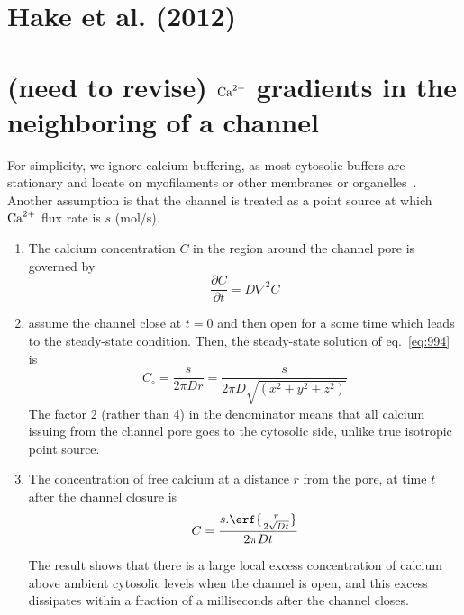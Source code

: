 \section{Hake et al. (2012)}

\section{(need to revise) ${\text{Ca}^{2+}}$ gradients in the neighboring of a channel}
\label{sec:calcium-gradient-neighborhood-channels}

For simplicity, we ignore calcium buffering, as most cytosolic buffers
are stationary and locate on myofilaments or other membranes or
organelles~\citep{stern1992tec}. Another assumption is that the
channel is treated as a point source at which ${\text{Ca}^{2+}}$ flux rate is $s$
(mol/s). 
\begin{enumerate}
\item The calcium concentration $C$ in the region around the channel
  pore is governed by
  \begin{equation}
    \label{eq:994}
    \frac{\partial C}{\partial t} = D\nabla^2C
  \end{equation}

\item assume the channel close at $t=0$ and then open for a some time
  which leads to the steady-state condition.  Then, the steady-state
  solution of eq.~\eqref{eq:994} is
  \begin{equation}
    \label{eq:995}
    C_\circ = \frac{s}{2\pi Dr} = \frac{s}{2\pi D\sqrt{(x^2+y^2+z^2)}}
  \end{equation}
  The factor 2 (rather than 4) in the denominator means that all calcium
  issuing from the channel pore goes to the cytosolic side, unlike true
  isotropic point source.
\item The concentration of free calcium at a distance $r$ from the
  pore, at time $t$ after the channel closure is
  \begin{equation}
    \label{eq:996}
    C = \frac{s.\erf\{\frac{r}{2\sqrt{Dt}}\}}{2\pi Dt}
  \end{equation}

  The result shows that there is a large local excess concentration of
  calcium above ambient cytosolic levels when the channel is open, and
  this excess dissipates within a fraction of a milliseconds after the
  channel closes. 

\end{enumerate}


